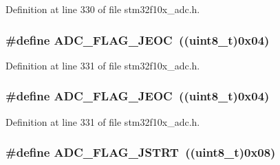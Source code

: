 Definition at line 330 of file stm32f10x\+\_\+adc.\+h.

\subsubsection[{\texorpdfstring{A\+D\+C\+\_\+\+F\+L\+A\+G\+\_\+\+J\+E\+OC}{ADC_FLAG_JEOC}}]{\setlength{\rightskip}{0pt plus 5cm}\#define A\+D\+C\+\_\+\+F\+L\+A\+G\+\_\+\+J\+E\+OC~(({\bf uint8\+\_\+t})0x04)}\hypertarget{group___a_d_c__flags__definition_ga4df8eea8ab83d98104ee15a339743a4e}{}\label{group___a_d_c__flags__definition_ga4df8eea8ab83d98104ee15a339743a4e}


Definition at line 331 of file stm32f10x\+\_\+adc.\+h.

\subsubsection[{\texorpdfstring{A\+D\+C\+\_\+\+F\+L\+A\+G\+\_\+\+J\+E\+OC}{ADC_FLAG_JEOC}}]{\setlength{\rightskip}{0pt plus 5cm}\#define A\+D\+C\+\_\+\+F\+L\+A\+G\+\_\+\+J\+E\+OC~(({\bf uint8\+\_\+t})0x04)}\hypertarget{group___a_d_c__flags__definition_ga4df8eea8ab83d98104ee15a339743a4e}{}\label{group___a_d_c__flags__definition_ga4df8eea8ab83d98104ee15a339743a4e}


Definition at line 331 of file stm32f10x\+\_\+adc.\+h.

\subsubsection[{\texorpdfstring{A\+D\+C\+\_\+\+F\+L\+A\+G\+\_\+\+J\+S\+T\+RT}{ADC_FLAG_JSTRT}}]{\setlength{\rightskip}{0pt plus 5cm}\#define A\+D\+C\+\_\+\+F\+L\+A\+G\+\_\+\+J\+S\+T\+RT~(({\bf uint8\+\_\+t})0x08)}\hypertarget{group___a_d_c__flags__definition_ga278f4e866f4322c1120bf0db5301c432}{}\label{group___a_d_c__flags__definition_ga278f4e866f4322c1120bf0db5301c432}


